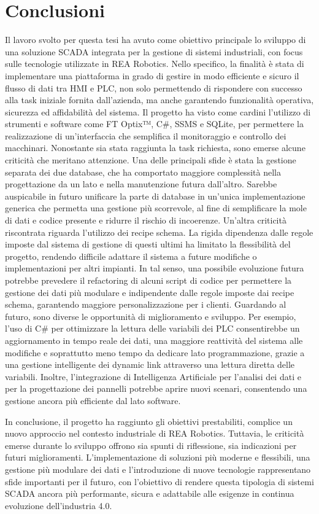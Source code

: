 \chapter{Conclusioni}

Il lavoro svolto per questa tesi ha avuto come obiettivo principale lo sviluppo di una soluzione SCADA integrata per la gestione di sistemi industriali, con focus sulle tecnologie utilizzate in REA Robotics. Nello specifico, la finalità è stata di implementare una piattaforma in grado di gestire in modo efficiente e sicuro il flusso di dati tra HMI e PLC, non solo permettendo di rispondere con successo alla task iniziale fornita dall'azienda, ma anche garantendo funzionalità operativa, sicurezza ed affidabilità del sistema. Il progetto ha visto come cardini l'utilizzo di strumenti e software come FT Optix™, C\#, SSMS e SQLite, per permettere la realizzazione di un'interfaccia che semplifica il monitoraggio e controllo dei macchinari. Nonostante sia stata raggiunta la task richiesta, sono emerse alcune criticità che meritano attenzione. Una delle principali sfide è stata la gestione separata dei due database, che ha comportato maggiore complessità nella progettazione da un lato e nella manutenzione futura dall'altro. Sarebbe auspicabile in futuro unificare la parte di database in un'unica implementazione generica che permetta una gestione più scorrevole, al fine di semplificare la mole di dati e codice presente e ridurre il rischio di incoerenze. Un'altra criticità riscontrata riguarda l'utilizzo dei recipe schema. La rigida dipendenza dalle regole imposte dal sistema di gestione di questi ultimi ha limitato la flessibilità del progetto, rendendo difficile adattare il sistema a future modifiche o implementazioni per altri impianti. In tal senso, una possibile evoluzione futura potrebbe prevedere il refactoring di alcuni script di codice per permettere la gestione dei dati più modulare e indipendente dalle regole imposte dai recipe schema, garantendo maggiore personalizzazione per i clienti. Guardando al futuro, sono diverse le opportunità di miglioramento e sviluppo. Per esempio, l'uso di C\# per ottimizzare la lettura delle variabili dei PLC consentirebbe un aggiornamento in tempo reale dei dati, una maggiore reattività del sistema alle modifiche e soprattutto meno tempo da dedicare lato programmazione, grazie a una gestione intelligente dei dynamic link attraverso una lettura diretta delle variabili. Inoltre, l'integrazione di Intelligenza Artificiale per l'analisi dei dati e per la progettazione dei pannelli potrebbe aprire nuovi scenari, consentendo una gestione ancora più efficiente dal lato software.

In conclusione, il progetto ha raggiunto gli obiettivi prestabiliti, complice un nuovo approccio nel contesto industriale di REA Robotics. Tuttavia, le criticità emerse durante lo sviluppo offrono sia spunti di riflessione, sia indicazioni per futuri miglioramenti. L'implementazione di soluzioni più moderne e flessibili, una gestione più modulare dei dati e l'introduzione di nuove tecnologie rappresentano sfide importanti per il futuro, con l'obiettivo di rendere questa tipologia di sistemi SCADA ancora più performante, sicura e adattabile alle esigenze in continua evoluzione dell'industria 4.0.

